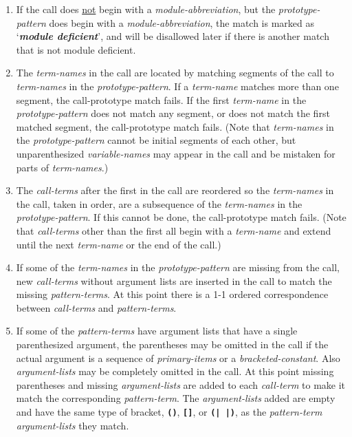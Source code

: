 \documentclass[12pt]{article}
\newcommand{\TT}[1]{{\tt \bfseries #1}}
\newcommand{\key}[1]{{\bf \em #1}\index{#1}}
\begin{document}
\begin{enumerate}
\item If the call does \underline{not} begin
with a {\em module-abbreviation}, but the {\em prototype-pattern}
does begin with a {\em module-abbreviation}, the match is marked
as `\key{module deficient}'\label{MODULE-DEFICIENT},
and will be disallowed later if there is
another match that is not module deficient.

\item
The {\em term-names} in the call are located by
matching segments of the call to
{\em term-names} in the {\em prototype-pattern}.
If a {\em term-name} matches more than one segment,
the call-prototype match fails.  If the first {\em term-name}
in the {\em prototype-pattern} does not match any segment,
or does not match the first matched segment, the call-prototype match fails.
(Note that {\em term-names} in the {\em prototype-pattern}
cannot be initial segments of each other, but unparenthesized
{\em variable-names} may appear in the call and be
mistaken for parts of {\em term-names}.)

\item The {\em call-terms} after the first in the call
are reordered so the {\em term-names} in the call,
taken in order, are a subsequence of the {\em term-names} in the
{\em prototype-pattern}.
If this cannot be done, the call-prototype match fails.
(Note that {\em call-terms} other than the first all begin with
a {\em term-name} and extend until the next {\em term-name}
or the end of the call.)

\item\label{ADD-TERMS}
If some of the {\em term-names} in the {\em prototype-pattern}
are missing from the call,
new {\em call-terms} without argument lists
are inserted in the call to match the missing
{\em pattern-terms}.  At this point there is a 1-1 ordered correspondence
between {\em call-terms} and {\em pattern-terms}.

\item
If some of the {\em pattern-terms} have argument lists that
have a single parenthesized argument, the parentheses may be omitted
in the call if the actual argument is a sequence of
{\em primary-items} or a {\em bracketed-constant}.
Also {\em argument-lists}
may be completely omitted in the call.  At this point
missing parentheses and missing {\em argument-lists} are added to
each {\em call-term} to make it match the corresponding
{\em pattern-term}.
The {\em argument-lists} added are empty and have the same type of
bracket, \TT{()}, \TT{[]}, or \TT{(|~|)}, as the {\em pattern-term}
{\em argument-lists} they match.


\end{enumerate}
\end{document}
